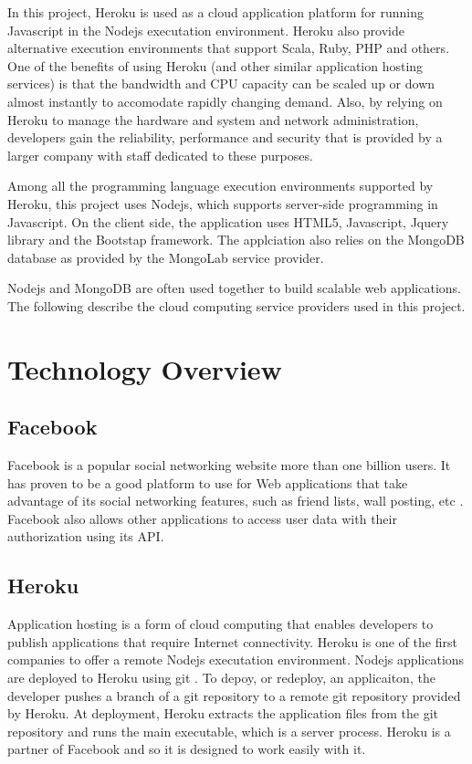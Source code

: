 In this project, Heroku is used as a cloud application platform for running Javascript in the Nodejs executation environment. Heroku also provide alternative execution environments that support Scala, Ruby, PHP and others.  One of the benefits of using Heroku (and other similar application hosting services) is that the bandwidth and CPU capacity can be scaled up or down almost instantly to accomodate rapidly changing demand.  Also, by relying on Heroku to manage the hardware and system and network administration, developers gain the reliability, performance and security that is provided by a larger company with staff dedicated to these purposes.

Among all the programming language execution environments supported by Heroku, this project uses Nodejs, which supports server-side programming in Javascript. On the client side, the application uses HTML5, Javascript, Jquery library and the Bootstap framework. The applciation also relies on the MongoDB database as provided by the MongoLab service provider.

Nodejs and MongoDB are often used together to build scalable web applications. The following describe the cloud computing service providers used in this project.

\section{Technology Overview}

\subsection{Facebook}
Facebook is a popular social networking website more than one billion users. It has proven to be a good platform to use for Web applications that take advantage of its social networking features, such as friend lists, wall posting, etc \cite{Facebook}. Facebook also allows other applications to access user data with their authorization using its API. 

\subsection{Heroku}
Application hosting is a form of cloud computing that enables developers to publish applications that require Internet connectivity. Heroku is one of the first companies to offer a remote Nodejs executation environment.  Nodejs applications are deployed to Heroku using git \cite{Heroku}.  To depoy, or redeploy, an applicaiton, the developer pushes a branch of a git repository to a remote git repository provided by Heroku.  At deployment, Heroku extracts the application files from the git repository and runs the main executable, which is a server process.  Heroku is a partner of Facebook and so it is designed to work easily with it. 

